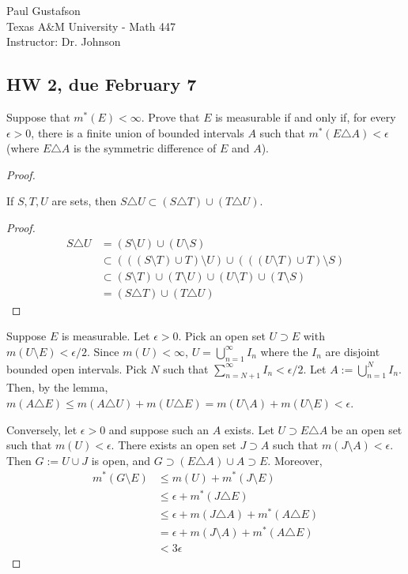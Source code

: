 \documentclass{article}
\begin{document}
\noindent Paul Gustafson\\
\noindent Texas A\&M University - Math 447\\ 
\noindent Instructor: Dr. Johnson

\subsection*{HW 2, due February 7}
 Suppose that $m^*(E) < \infty$. Prove that $E$ is measurable if and only if, for every $\epsilon > 0$, there is a finite union of bounded intervals $A$ such that $m^*(E\triangle A) < \epsilon$ (where $E\triangle A$ is the symmetric difference of $E$ and $A$).
\begin{proof}
\begin{lemma}
If $S,T,U$ are sets, then $S\triangle U \subset (S\triangle T) \cup (T\triangle U)$.
\end{lemma}
\begin{proof}
\begin{align*} 
S \triangle U & = (S\setminus U) \cup (U \setminus S) \\
& \subset  (((S \setminus T) \cup T) \setminus U) \cup (((U \setminus T) \cup T) \setminus S) \\
&\subset  (S \setminus T) \cup (T \setminus U) \cup (U \setminus T) \cup (T \setminus S) \\
& =  (S\triangle T) \cup (T\triangle U)
\end{align*}
\end{proof}

Suppose $E$ is measurable. Let $\epsilon > 0$. Pick an open set $U \supset E$ with $m(U \setminus E) < \epsilon/2$. Since $m(U) < \infty$, $U = \bigcup_{n=1}^\infty I_n$ where the $I_n$ are disjoint bounded open intervals.  Pick $N$ such that $\sum_{n=N+1}^\infty I_n < \epsilon/2$. Let $A := \bigcup_{n=1}^N I_n$. Then, by the lemma, $m(A \triangle E) \le m(A \triangle U) + m(U \triangle E)  = m(U \setminus A) + m(U\setminus E) < \epsilon$.

Conversely, let $\epsilon > 0$ and suppose such an $A$ exists. Let $U \supset E\triangle A$ be an open set such that $m(U) < \epsilon$. There exists an open set $J\supset A$ such that $m(J\setminus A) < \epsilon$. Then $G := U \cup J$ is open, and $G \supset (E\triangle A) \cup A \supset E$. Moreover, 
\begin{align*}
m^*(G \setminus E) & \leq  m(U) + m^*(J \setminus E) 
\\ & \le \epsilon + m^*(J \triangle E)
\\ & \le \epsilon + m(J \triangle A) + m^*(A \triangle E)
\\ & = \epsilon + m(J \setminus A) + m^*(A \triangle E)
\\ & < 3\epsilon
\end{align*}
\end{proof}
\end{document}
